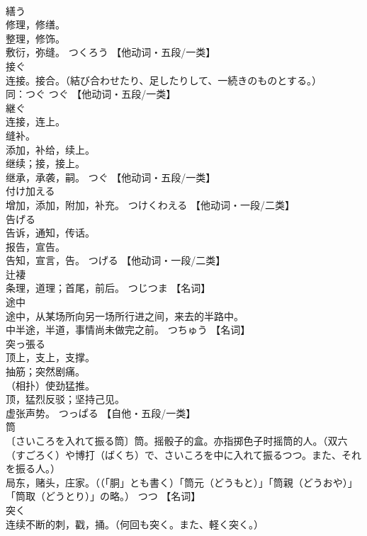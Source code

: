 \documentclass[8pt]{extreport}
\begin{document}
\begin{CJK}{UTF8}{min}
\\	繕う	
\\	修理，修缮。 
\\	整理，修饰。 
\\	敷衍，弥缝。	つくろう		【他动词・五段/一类】
\\	接ぐ	
\\	连接。接合。（結び合わせたり、足したりして、一続きのものとする。） 
\\	同：つぐ	つぐ		【他动词・五段/一类】
\\	継ぐ	
\\	连接，连上。 
\\	缝补。 
\\	添加，补给，续上。 
\\	继续；接，接上。 
\\	继承，承袭，嗣。	つぐ		【他动词・五段/一类】
\\	付け加える	
\\	增加，添加，附加，补充。	つけくわえる		【他动词・一段/二类】
\\	告げる	
\\	告诉，通知，传话。 
\\	报告，宣告。 
\\	告知，宣言，告。	つげる		【他动词・一段/二类】
\\	辻褄	
\\	条理，道理；首尾，前后。	つじつま		【名词】
\\	途中	
\\	途中，从某场所向另一场所行进之间，来去的半路中。 
\\	中半途，半道，事情尚未做完之前。	つちゅう		【名词】
\\	突っ張る	
\\	顶上，支上，支撑。 
\\	抽筋；突然剧痛。 
\\	（相扑）使劲猛推。 
\\	顶，猛烈反驳；坚持己见。 
\\	虚张声势。	つっぱる		【自他・五段/一类】
\\	筒	
\\	〔さいころを入れて振る筒〕筒。摇骰子的盒。亦指掷色子时摇筒的人。（双六（すごろく）や博打（ばくち）で、さいころを中に入れて振るつつ。また、それを振る人。） 
\\	局东，赌头，庄家。（（「胴」とも書く）「筒元（どうもと）」「筒親（どうおや）」「筒取（どうとり）」の略。）	つつ		【名词】
\\	突く	
\\	连续不断的刺，戳，捅。（何回も突く。また、軽く突く。） 

\end{CJK}
\end{document}
